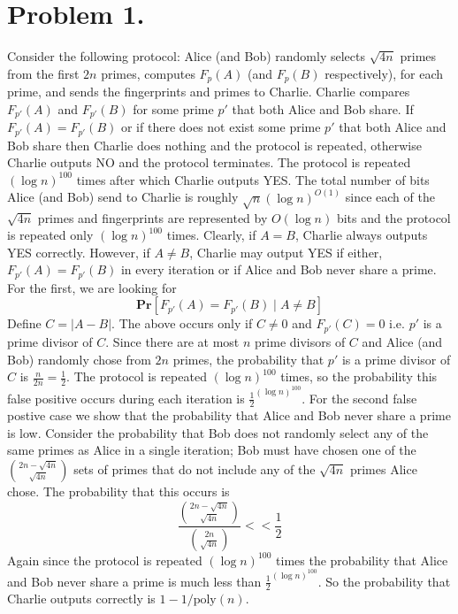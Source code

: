 \documentclass[12pt]{article}
\begin{document}
\pagestyle{plain}
\titleformat{\subsection}[runin]
  {\normalfont\large\bfseries}{\thesubsection}{1em}{}
\titleformat{\subsubsection}[runin]
  {\normalfont\large\bfseries}{\thesubsubsection}{1em}{}

\section*{Problem 1.}
Consider the following protocol: Alice (and Bob) randomly selects $\sqrt{4n}$
primes from the first $2n$ primes, computes $F_p(A)$ (and $F_p(B)$ respectively),
for each prime, and sends the fingerprints and primes to Charlie.
Charlie compares $F_{p'}(A)$ and $F_{p'}(B)$ for some prime $p'$ that both
Alice and Bob share. If $F_{p'}(A) = F_{p'}(B)$ or if there does not exist some
prime $p'$ that both Alice and Bob share then Charlie does nothing and the
protocol is repeated, otherwise Charlie outputs NO and the protocol terminates.
The protocol is repeated $(\log{n})^{100}$ times after which Charlie outputs YES.
The total number of bits Alice (and Bob) send to Charlie is roughly
$\sqrt{n}(\log{n})^{O(1)}$ since each of the $\sqrt{4n}$ primes and fingerprints
are represented by $O(\log{n})$ bits and the protocol is repeated only
$(\log{n})^{100}$ times. Clearly, if $A = B$, Charlie always outputs YES
correctly. However, if $A \neq B$, Charlie may output YES if either,
$F_{p'}(A) = F_{p'}(B)$ in every iteration or if Alice and Bob never share
a prime. For the first, we are looking for
$$\textbf{Pr}[F_{p'}(A) = F_{p'}(B) \mid A \neq B]$$
Define $C = |A-B|$. The above occurs only if $C \neq 0$ and $F_{p'}(C) = 0$
i.e. $p'$ is a prime divisor of $C$. Since there are at most $n$ prime divisors
of $C$ and Alice (and Bob) randomly chose from $2n$ primes, the probability
that $p'$ is a prime divisor of $C$ is $\frac{n}{2n} = \frac{1}{2}$.
The protocol is repeated $(\log{n})^{100}$ times, so the probability this false
positive occurs during each iteration is $\frac{1}{2}^{(\log{n})^{100}}$. For
the second false postive case we show that the probability that Alice and Bob
never share a prime is low. Consider the probability that Bob does not randomly
select any of the same primes as Alice in a single iteration; Bob must have
chosen one of the $2n-\sqrt{4n} \choose \sqrt{4n}$ sets of primes that do not
include any of the $\sqrt{4n}$ primes Alice chose. The probability that this
occurs is
$$\frac{{2n-\sqrt{4n} \choose \sqrt{4n}}}{{2n \choose \sqrt{4n}}} << \frac{1}{2} $$
Again since the protocol is repeated $(\log{n})^{100}$ times the probability
that Alice and Bob never share a prime is much less than
$\frac{1}{2}^{(\log{n})^{100}}$. So the probability that Charlie outputs
correctly is $1-1/\text{poly}(n)$.
\end{document}

